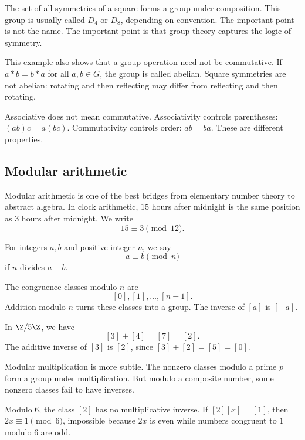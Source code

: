 The set of all symmetries of a square forms a group under composition. This
group is usually called $D_4$ or $D_8$, depending on convention. The important
point is not the name. The important point is that group theory captures the
logic of symmetry.

This example also shows that a group operation need not be commutative. If
$a\ast b=b\ast a$ for all $a,b\in G$, the group is called abelian. Square
symmetries are not abelian: rotating and then reflecting may differ from
reflecting and then rotating.

\begin{trapbox}
Associative does not mean commutative. Associativity controls parentheses:
$(ab)c=a(bc)$. Commutativity controls order: $ab=ba$. These are different
properties.
\end{trapbox}

\subsection{Modular arithmetic}

Modular arithmetic is one of the best bridges from elementary number theory to
abstract algebra. In clock arithmetic, $15$ hours after midnight is the same
position as $3$ hours after midnight. We write
\[
15\equiv 3\pmod{12}.
\]

\begin{definition}
For integers $a,b$ and positive integer $n$, we say
\[
a\equiv b\pmod n
\]
if $n$ divides $a-b$.
\end{definition}

The congruence classes modulo $n$ are
\[
[0],[1],\ldots,[n-1].
\]
Addition modulo $n$ turns these classes into a group. The inverse of $[a]$ is
$[-a]$.

\begin{example}
In $\Z/5\Z$, we have
\[
[3]+[4]=[7]=[2].
\]
The additive inverse of $[3]$ is $[2]$, since $[3]+[2]=[5]=[0]$.
\end{example}

Modular multiplication is more subtle. The nonzero classes modulo a prime $p$
form a group under multiplication. But modulo a composite number, some nonzero
classes fail to have inverses.

\begin{example}
Modulo $6$, the class $[2]$ has no multiplicative inverse. If $[2][x]=[1]$,
then $2x\equiv 1\pmod 6$, impossible because $2x$ is even while numbers
congruent to $1$ modulo $6$ are odd.
\end{example}

